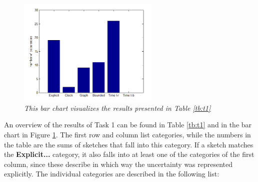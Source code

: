 \begin{figure}[H]
	\centering
	\includegraphics[width=0.6\textwidth]{figures/barT1.PNG}
	\caption{\textit{This bar chart visualizes the results presented in Table \ref{tb:t1}}}
	\label{fig:t1bar}
\end{figure}

An overview of the results of Task 1 can be found in Table \ref{tb:t1} and in the bar chart in Figure \ref{fig:t1bar}. The first row and column list categories, while the numbers in the table are the sums of sketches that fall into this category. If a sketch matches the \textbf{Explicit...} category, it also falls into at least one of the categories of the first column, since these describe in which way the uncertainty was represented explicitly. The individual categories are described in the following list:

